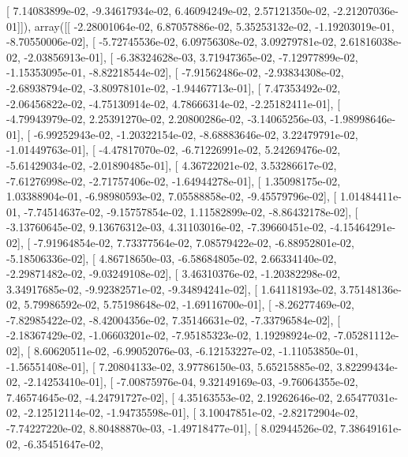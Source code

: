 \documentclass{article}
\begin{document}
       [  7.14083899e-02,  -9.34617934e-02,   6.46094249e-02,
          2.57121350e-02,  -2.21207036e-01]]), array([[ -2.28001064e-02,   6.87057886e-02,   5.35253132e-02,
         -1.19203019e-01,  -8.70550006e-02],
       [ -5.72745536e-02,   6.09756308e-02,   3.09279781e-02,
          2.61816038e-02,  -2.03856913e-01],
       [ -6.38324628e-03,   3.71947365e-02,  -7.12977899e-02,
         -1.15353095e-01,  -8.82218544e-02],
       [ -7.91562486e-02,  -2.93834308e-02,  -2.68938794e-02,
         -3.80978101e-02,  -1.94467713e-01],
       [  7.47353492e-02,  -2.06456822e-02,  -4.75130914e-02,
          4.78666314e-02,  -2.25182411e-01],
       [ -4.79943979e-02,   2.25391270e-02,   2.20800286e-02,
         -3.14065256e-03,  -1.98998646e-01],
       [ -6.99252943e-02,  -1.20322154e-02,  -8.68883646e-02,
          3.22479791e-02,  -1.01449763e-01],
       [ -4.47817070e-02,  -6.71226991e-02,   5.24269476e-02,
         -5.61429034e-02,  -2.01890485e-01],
       [  4.36722021e-02,   3.53286617e-02,  -7.61276998e-02,
         -2.71757406e-02,  -1.64944278e-01],
       [  1.35098175e-02,   1.03388904e-01,  -6.98980593e-02,
          7.05588858e-02,  -9.45579796e-02],
       [  1.01484411e-01,  -7.74514637e-02,  -9.15757854e-02,
          1.11582899e-02,  -8.86432178e-02],
       [ -3.13760645e-02,   9.13676312e-03,   4.31103016e-02,
         -7.39660451e-02,  -4.15464291e-02],
       [ -7.91964854e-02,   7.73377564e-02,   7.08579422e-02,
         -6.88952801e-02,  -5.18506336e-02],
       [  4.86718650e-03,  -6.58684805e-02,   2.66334140e-02,
         -2.29871482e-02,  -9.03249108e-02],
       [  3.46310376e-02,  -1.20382298e-02,   3.34917685e-02,
         -9.92382571e-02,  -9.34894241e-02],
       [  1.64118193e-02,   3.75148136e-02,   5.79986592e-02,
          5.75198648e-02,  -1.69116700e-01],
       [ -8.26277469e-02,  -7.82985422e-02,  -8.42004356e-02,
          7.35146631e-02,  -7.33796584e-02],
       [ -2.18367429e-02,  -1.06603201e-02,  -7.95185323e-02,
          1.19298924e-02,  -7.05281112e-02],
       [  8.60620511e-02,  -6.99052076e-03,  -6.12153227e-02,
         -1.11053850e-01,  -1.56551408e-01],
       [  7.20804133e-02,   3.97786150e-03,   5.65215885e-02,
          3.82299434e-02,  -2.14253410e-01],
       [ -7.00875976e-04,   9.32149169e-03,  -9.76064355e-02,
          7.46574645e-02,  -4.24791727e-02],
       [  4.35163553e-02,   2.19262646e-02,   2.65477031e-02,
         -2.12512114e-02,  -1.94735598e-01],
       [  3.10047851e-02,  -2.82172904e-02,  -7.74227220e-02,
          8.80488870e-03,  -1.49718477e-01],
       [  8.02944526e-02,   7.38649161e-02,  -6.35451647e-02,
\end{document}
